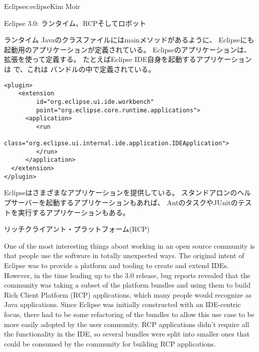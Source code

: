 \begin{aosachapter}{Eclipse}{s:eclipse}{Kim Moir}
\begin{aosasect1}{Eclipse 3.0: ランタイム、RCPそしてロボット}
\begin{aosasect2}{ランタイム}
Javaのクラスファイルにはmainメソッドがあるように、
Eclipseにも起動用のアプリケーションが定義されている。
Eclipseのアプリケーションは、拡張を使って定義する。
たとえばEclipse IDE自身を起動するアプリケーションは
で、これは
バンドルの中で定義されている。

\begin{verbatim}
<plugin>
    <extension
         id="org.eclipse.ui.ide.workbench"
         point="org.eclipse.core.runtime.applications">
      <application>
         <run
               class="org.eclipse.ui.internal.ide.application.IDEApplication">
         </run>
      </application>
  </extension>
</plugin>
\end{verbatim}

Eclipseはさまざまなアプリケーションを提供している。
スタンドアロンのヘルプサーバーを起動するアプリケーションもあれば、
AntのタスクやJUnitのテストを実行するアプリケーションもある。

\end{aosasect2}

\begin{aosasect2}{リッチクライアント・プラットフォーム(RCP)}

One of the most interesting things about working in an open source
community is that people use the software in totally unexpected ways.
The original intent of Eclipse was to provide a platform and tooling
to create and extend IDEs.  However, in the time leading up to the 3.0
release, bug reports revealed that the community was taking a subset
of the platform bundles and using them to build Rich Client Platform
(RCP) applications, which many people would recognize as Java applications.  Since Eclipse was initially constructed with an
IDE-centric focus, there had to be some refactoring of the bundles to
allow this use case to be more easily adopted by the user
community. RCP applications didn't require all the functionality in
the IDE, so several bundles were split into smaller ones that could be
consumed by the community for building RCP applications.  


\end{aosasect2}
\end{aosasect1}
\end{aosachapter}
